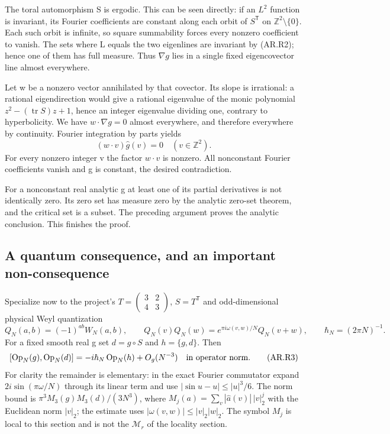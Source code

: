 The toral automorphism S is ergodic. This can be seen directly: if an \(L^2\) function is invariant, its Fourier coefficients are constant along each orbit of \(S^{\mathsf T}\) on \(\mathbb Z^2\setminus\{0\}\). Each such orbit is infinite, so square summability forces every nonzero coefficient to vanish. The sets where L equals the two eigenlines are invariant by (AR.R2); hence one of them has full measure. Thus \(\nabla g\) lies in a single fixed eigencovector line almost everywhere.

Let w be a nonzero vector annihilated by that covector. Its slope is irrational: a rational eigendirection would give a rational eigenvalue of the monic polynomial \(z^2-(\operatorname{tr}S)z+1\), hence an integer eigenvalue dividing one, contrary to hyperbolicity. We have \(w\cdot\nabla g=0\) almost everywhere, and therefore everywhere by continuity. Fourier integration by parts yields \[
             (w\cdot v)\widehat g(v)=0\quad(v\in\mathbb Z^2).
\] For every nonzero integer v the factor \(w\cdot v\) is nonzero. All nonconstant Fourier coefficients vanish and g is constant, the desired contradiction.

For a nonconstant real analytic g at least one of its partial derivatives is not identically zero. Its zero set has measure zero by the analytic zero-set theorem, and the critical set is a subset. The preceding argument proves the analytic conclusion. This finishes the proof.

\subsection{A quantum consequence, and an important non-consequence}\label{analytic:a-quantum-consequence-and-an-important-non-consequence}

Specialize now to the project's \(T=\left(\begin{smallmatrix}3&2\\4&3\end{smallmatrix}\right)\), \(S=T^{\mathsf T}\) and odd-dimensional physical Weyl quantization \[
 Q_N(a,b)=(-1)^{ab}W_N(a,b),\qquad
 Q_N(v)Q_N(w)=e^{\pi i\omega(v,w)/N}Q_N(v+w),\qquad
 \hbar_N=(2\pi N)^{-1}.
\] For a fixed smooth real g set \(d=g\circ S\) and \(h=\{g,d\}\). Then \[
 [\operatorname{Op}_N(g),\operatorname{Op}_N(d)]
       =-i\hbar_N\operatorname{Op}_N(h)+O_g(N^{-3})
                  \quad\hbox{in operator norm}.             \tag{AR.R3}
\] For clarity the remainder is elementary: in the exact Fourier commutator expand \(2i\sin(\pi\omega/N)\) through its linear term and use \(|\sin u-u|\leq |u|^3/6\). The norm bound is \(\pi^3 M_3(g)M_3(d)/(3N^3)\), where \(M_j(a)=\sum_v|\widehat a(v)|\,|v|_2^j\) with the Euclidean norm \(|v|_2\); the estimate uses \(|\omega(v,w)|\le|v|_2|w|_2\). The symbol \(M_j\) is local to this section and is not the \(\mathcal M_r\) of the locality section.

